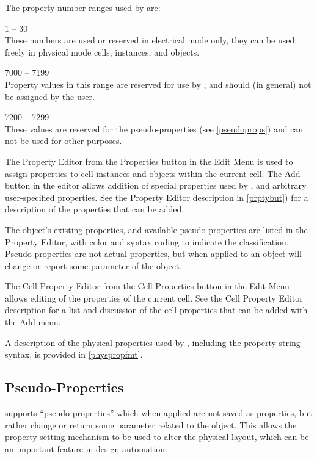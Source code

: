 The property number ranges used by {\Xic} are:
\begin{description}
\item{1 -- 30}\\
These numbers are used or reserved in electrical mode only, they can
be used freely in physical mode cells, instances, and objects.
\item{7000 -- 7199}\\
Property values in this range are reserved for use by {\Xic},
and should (in general) not be assigned by the user.
\item{7200 -- 7299}\\
These values are reserved for the pseudo-properties (see
\ref{pseudoprops}) and can not be used for other purposes.
\end{description}

The {\cb Property Editor} from the {\cb Properties} button in the {\cb
Edit Menu} is used to assign properties to cell instances and objects
within the current cell.  The {\cb Add} button in the editor allows
addition of special properties used by {\Xic}, and arbitrary
user-specified properties.  See the {\cb Property Editor} description
in \ref{prptybut}) for a description of the properties that can be
added.

The object's existing properties, and available pseudo-properties are
listed in the {\cb Property Editor}, with color and syntax coding to
indicate the classification.  Pseudo-properties are not actual
properties, but when applied to an object will change or report some
parameter of the object.

The {\cb Cell Property Editor} from the {\cb Cell Properties} button
in the {\cb Edit Menu} allows editing of the properties of the current
cell.  See the {\cb Cell Property Editor} description for a list and
discussion of the cell properties that can be added with the {\cb Add}
menu.

A description of the physical properties used by {\Xic}, including the
property string syntax, is provided in \ref{physpropfmt}.


\subsection{Pseudo-Properties}
\label{pseudoprops}

{\Xic} supports ``pseudo-properties'' which when applied are not saved
as properties, but rather change or return some parameter related to
the object.  This allows the property setting mechanism to be used to
alter the physical layout, which can be an important feature in design
automation.

